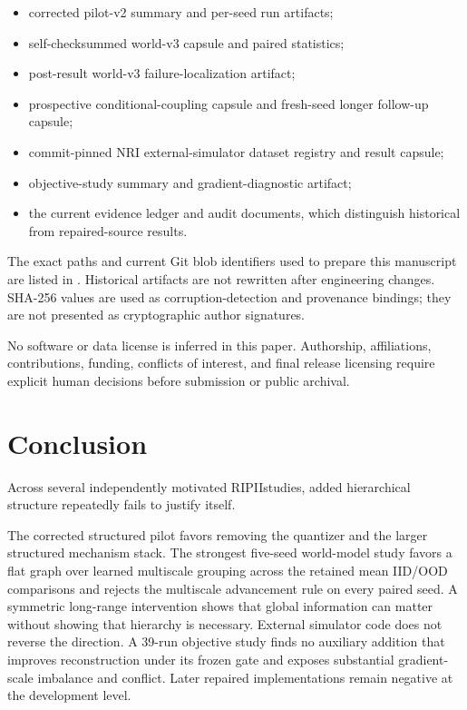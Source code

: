 \documentclass[10pt]{article}
\newcommand{\RIPII}{\textsc{RIPII}}
\begin{document}
\begin{itemize}
    \item corrected pilot-v2 summary and per-seed run artifacts;
    \item self-checksummed world-v3 capsule and paired statistics;
    \item post-result world-v3 failure-localization artifact;
    \item prospective conditional-coupling capsule and fresh-seed longer follow-up capsule;
    \item commit-pinned NRI external-simulator dataset registry and result capsule;
    \item objective-study summary and gradient-diagnostic artifact;
    \item the current evidence ledger and audit documents, which distinguish historical from repaired-source results.
\end{itemize}

The exact paths and current Git blob identifiers used to prepare this manuscript are listed in . Historical artifacts are not rewritten after engineering changes. SHA-256 values are used as corruption-detection and provenance bindings; they are not presented as cryptographic author signatures.

No software or data license is inferred in this paper. Authorship, affiliations, contributions, funding, conflicts of interest, and final release licensing require explicit human decisions before submission or public archival.

\section{Conclusion}

Across several independently motivated \RIPII studies, added hierarchical structure repeatedly fails to justify itself.

The corrected structured pilot favors removing the quantizer and the larger structured mechanism stack. The strongest five-seed world-model study favors a flat graph over learned multiscale grouping across the retained mean IID/OOD comparisons and rejects the multiscale advancement rule on every paired seed. A symmetric long-range intervention shows that global information can matter without showing that hierarchy is necessary. External simulator code does not reverse the direction. A 39-run objective study finds no auxiliary addition that improves reconstruction under its frozen gate and exposes substantial gradient-scale imbalance and conflict. Later repaired implementations remain negative at the development level.
\end{document}
